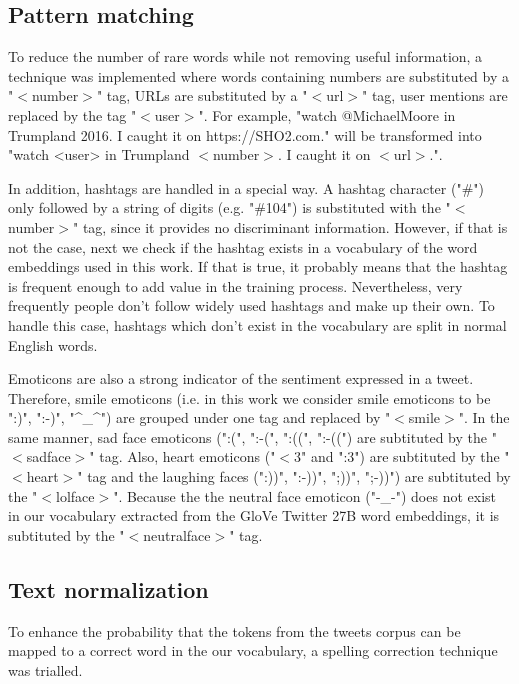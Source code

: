 \documentclass[10pt,conference,compsocconf]{IEEEtran}
\begin{document}
\subsection{Pattern matching} \label{subsec:pattern_matching}

To reduce the number of rare words while not removing useful information, a technique was implemented where words containing numbers are substituted by a "$<$number$>$" tag, URLs are substituted by a "$<$url$>$" tag, user mentions are replaced by the tag "$<$user$>$". For example, "watch @MichaelMoore in Trumpland 2016. I caught it on https://SHO2.com." will be transformed into "watch <user> in Trumpland $<$number$>$. I caught it on $<$url$>$.". 

In addition, hashtags are handled in a special way. A hashtag character ("\#") only followed by a string of digits (e.g. "\#104") is substituted with the "$<$number$>$" tag, since it provides no discriminant information. However, if that is not the case, next we check if the hashtag exists in a vocabulary of the word embeddings used in this work. If that is true, it probably means that the hashtag is frequent enough to add value in the training process. Nevertheless, very frequently people don't follow widely used hashtags and make up their own. To handle this case, hashtags which don't exist in the vocabulary are split in normal English words. 

Emoticons are also a strong indicator of the sentiment expressed in a tweet. Therefore, smile emoticons (i.e. in this work we consider smile emoticons to be ":)", ":-)", "\textasciicircum\_\textasciicircum") are grouped under one tag and replaced by "$<$smile$>$". In the same manner, sad face emoticons (":(", ":-(", ":((", ":-((") are subtituted by the "$<$sadface$>$" tag. Also, heart emoticons ("$<$3" and ":3") are subtituted by the "$<$heart$>$" tag and the laughing faces (":))", ":-))", ";))", ";-))") are subtituted by the "$<$lolface$>$". Because the the neutral face emoticon ("-\_-") does not exist in our vocabulary extracted from the GloVe Twitter 27B word embeddings, it is subtituted by the "$<$neutralface$>$" tag. 

\subsection{Text normalization} \label{subsec:text_norm}

To enhance the probability that the tokens from the tweets corpus can be mapped to a correct word in the our vocabulary, a spelling correction technique was trialled. 
\end{document}
